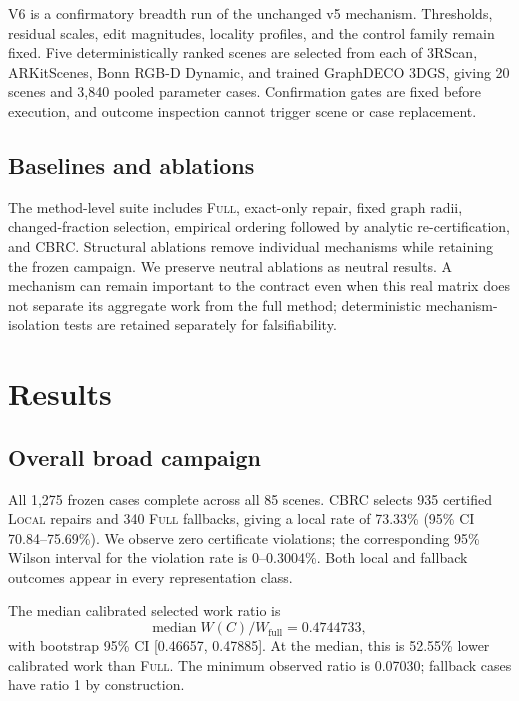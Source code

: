 \documentclass[acmtog,nonacm]{acmart}
\newcommand{\method}{CBRC}
\newcommand{\FULL}{\textsc{Full}}
\newcommand{\LOCAL}{\textsc{Local}}
\begin{document}
V6 is a confirmatory breadth run of the unchanged v5 mechanism. Thresholds, residual scales, edit magnitudes, locality profiles, and the control family remain fixed. Five deterministically ranked scenes are selected from each of 3RScan, ARKitScenes, Bonn RGB-D Dynamic, and trained GraphDECO 3DGS, giving 20 scenes and 3,840 pooled parameter cases. Confirmation gates are fixed before execution, and outcome inspection cannot trigger scene or case replacement.

\subsection{Baselines and ablations}
The method-level suite includes \FULL{}, exact-only repair, fixed graph radii, changed-fraction selection, empirical ordering followed by analytic re-certification, and \method{}. Structural ablations remove individual mechanisms while retaining the frozen campaign. We preserve neutral ablations as neutral results. A mechanism can remain important to the contract even when this real matrix does not separate its aggregate work from the full method; deterministic mechanism-isolation tests are retained separately for falsifiability.

\section{Results}
\label{sec:results}

\subsection{Overall broad campaign}
All 1,275 frozen cases complete across all 85 scenes. \method{} selects 935 certified \LOCAL{} repairs and 340 \FULL{} fallbacks, giving a local rate of 73.33\% (95\% CI 70.84--75.69\%). We observe zero certificate violations; the corresponding 95\% Wilson interval for the violation rate is 0--0.3004\%. Both local and fallback outcomes appear in every representation class.

The median calibrated selected work ratio is
\begin{equation}
\mathrm{median}\; W(C)/W_{\mathrm{full}} = 0.4744733,
\end{equation}
with bootstrap 95\% CI [0.46657, 0.47885]. At the median, this is 52.55\% lower calibrated work than \FULL{}. The minimum observed ratio is 0.07030; fallback cases have ratio 1 by construction.
\end{document}
